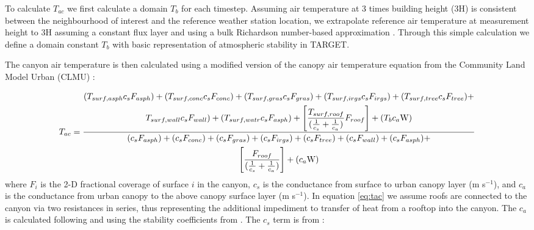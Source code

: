 \documentclass[gmd, manuscript]{copernicus}
\begin{document}
To calculate $T_{ac}$ we first calculate a domain \ensuremath{T_{b}} for each timestep. Assuming air temperature at 3 times building height (3H) is consistent between the neighbourhood of interest and the reference weather station location, we extrapolate reference air temperature at measurement height to 3H assuming a constant flux layer and using a bulk Richardson number-based approximation \citep{Mascart1995}. Through this simple calculation we define a domain constant \ensuremath{T_{b}} with basic representation of atmospheric stability in TARGET.  

The canyon air temperature is then calculated using a modified version of the canopy air temperature equation from the Community Land Model Urban (CLMU) \citep{Oleson2010}:

\begin{equation}
 \label{eq:tac}
  T_{ac} = 
  \frac{\begin{gathered} (T_{surf,asph} \ensuremath{c_{s}} F_{asph}) +  (T_{surf,conc} \ensuremath{c_{s}} F_{conc}) +  (T_{surf,gras} \ensuremath{c_{s}} F_{gras}) + (T_{surf,irgs} \ensuremath{c_{s}} F_{irgs}) + (T_{surf,tree} \ensuremath{c_{s}} F_{tree})  + \\ T_{surf,wall} \ensuremath{c_{s}} F_{wall}) +   (T_{surf,watr} \ensuremath{c_{s}} F_{asph}) +  \Bigg[\frac{T_{surf,roof}}  {(\frac{1}{\ensuremath{c_{s}}}+\frac{1}{\ensuremath{c_{a}}})} F_{roof}\Bigg] + (\ensuremath{T_{b}} \ensuremath{c_{a}} $W$)\end{gathered}}{\begin{gathered} 
      (\ensuremath{c_{s}} F_{asph}) +   (\ensuremath{c_{s}} F_{conc}) +  ( \ensuremath{c_{s}} F_{gras}) + ( \ensuremath{c_{s}} F_{irgs}) + ( \ensuremath{c_{s}} F_{tree})  +  (\ensuremath{c_{s}} F_{wall}) +   (\ensuremath{c_{s}} F_{asph}) + \\ \Bigg[\frac{F_{roof}}{(\frac{1}{\ensuremath{c_{s}}}+\frac{1}{\ensuremath{c_{a}}})}\Bigg] +(\ensuremath{c_{a}} $W$) \end{gathered}}
\end{equation} where $F_{i} $ is the 2-D fractional coverage of surface $i$ in the canyon,  \ensuremath{c_{s}} is the conductance from surface to urban canopy layer (m s$^{-1}$), and \ensuremath{c_{a}} is the conductance from urban canopy to the above canopy surface layer (m s$^{-1}$).
In equation \ref{eq:tac} we assume roofs are connected to the canyon via two resistances in series, thus representing the  additional impediment to transfer of heat from a rooftop into the canyon.  The \ensuremath{c_{a}} is calculated following \cite{Masson2000} and using the stability coefficients from \cite{Mascart1995}. %
The \ensuremath{c_{s}} term is from \cite{Masson2000}:
\end{document}
